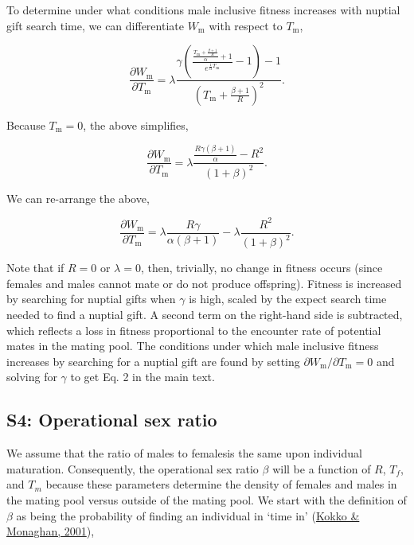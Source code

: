 \documentclass[
]{article}
\begin{document}
To determine under what conditions male inclusive fitness increases with
nuptial gift search time, we can differentiate \(W_{\mathrm{m}}\) with
respect to \(T_{\mathrm{m}}\),

\[\frac{\partial W_{\mathrm{m}}}{\partial T_{\mathrm{m}}} = \lambda\frac{\gamma\left(\frac{\frac{T_{\mathrm{m}} + \frac{\beta + 1}{R}}{\alpha} + 1}{e^{\frac{1}{\alpha}T_{\mathrm{m}}}} - 1\right) - 1}{\left(T_{\mathrm{m}} + \frac{\beta + 1}{R} \right)^{2}}.\]

Because \(T_{\mathrm{m}} = 0\), the above simplifies,

\[\frac{\partial W_{\mathrm{m}}}{\partial T_{\mathrm{m}}} = \lambda \frac{\frac{R\gamma\left(\beta + 1\right)}{\alpha} - R^{2}}{\left(1 + \beta \right)^{2}}.\]

We can re-arrange the above,

\[\frac{\partial W_{\mathrm{m}}}{\partial T_{\mathrm{m}}} = \lambda \frac{R\gamma}{\alpha\left(\beta+1\right)} - \lambda\frac{R^{2}}{{\left(1 + \beta \right)^{2}}}.\]

Note that if \(R = 0\) or \(\lambda = 0\), then, trivially, no change in
fitness occurs (since females and males cannot mate or do not produce
offspring). Fitness is increased by searching for nuptial gifts when
\(\gamma\) is high, scaled by the expect search time needed to find a
nuptial gift. A second term on the right-hand side is subtracted, which
reflects a loss in fitness proportional to the encounter rate of
potential mates in the mating pool. The conditions under which male
inclusive fitness increases by searching for a nuptial gift are found by
setting \(\partial W_{\mathrm{m}}/\partial T_{\mathrm{m}} = 0\) and
solving for \(\gamma\) to get Eq. 2 in the main text.

\clearpage

\hypertarget{s4-operational-sex-ratio}{%
\subsection{S4: Operational sex ratio}\label{s4-operational-sex-ratio}}

We assume that the ratio of males to femalesis the same upon individual
maturation. Consequently, the operational sex ratio \(\beta\) will be a
function of \(R\), \(T_{f}\), and \(T_{m}\) because these parameters
determine the density of females and males in the mating pool versus
outside of the mating pool. We start with the definition of \(\beta\) as
being the probability of finding an individual in `time in'
(\protect\hyperlink{ref-Kokko2001}{Kokko \& Monaghan, 2001}),
\end{document}
